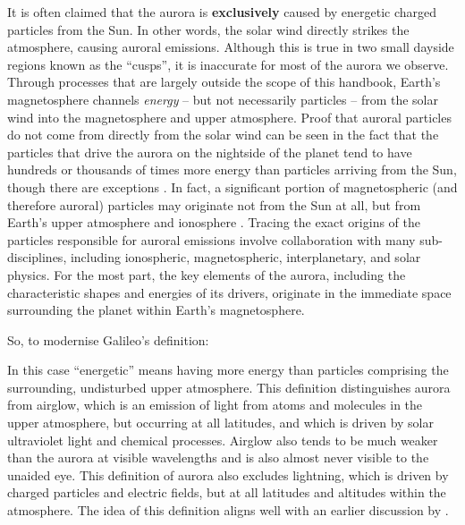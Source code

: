 \documentclass{article}
\renewcommand{\cite}[1]{\parencite{#1}}
\begin{document}
It is often claimed that the aurora is \textbf{exclusively} caused by energetic charged particles from the Sun. In other words, the solar wind directly strikes the atmosphere, causing auroral emissions. Although this is true in two small dayside regions known as the ``cusps'',  it is inaccurate for most of the aurora we observe. Through processes that are largely outside the scope of this handbook, Earth's magnetosphere channels {\it energy} -- but not necessarily particles -- from the solar wind into the magnetosphere and upper atmosphere.   
Proof that auroral particles do not come from directly from the solar wind can be seen in the fact that the particles that drive the aurora on the nightside of the planet tend to have hundreds or thousands of times more energy than particles arriving from the Sun, though there are exceptions \cite{Hosokawa2024}. In fact, a significant portion of magnetospheric (and therefore auroral) particles may originate not from the Sun at all, but from Earth's upper atmosphere and ionosphere \cite{Chappell1987}. Tracing the exact origins of the particles responsible for auroral emissions involve collaboration with many sub-disciplines, including ionospheric, magnetospheric, interplanetary, and solar physics. For the most part, the key elements of the aurora, including the characteristic shapes and energies of its drivers, originate in the immediate space surrounding the planet within Earth's magnetosphere. 

So, to modernise Galileo's definition: 
\newline

\noindent{} 
\newline

In this case ``energetic'' means having more energy than particles comprising the surrounding, undisturbed upper atmosphere. This definition distinguishes aurora from airglow, which is an emission of light from atoms and molecules in the upper atmosphere, but occurring at all latitudes, and which is driven by solar ultraviolet light and chemical processes. Airglow also tends to be much weaker than the aurora at visible wavelengths and is also almost never visible to the unaided eye. This definition of aurora also excludes lightning, which is driven by charged particles and electric fields, but at all latitudes and altitudes within the atmosphere. The idea of this definition aligns well with an earlier discussion by \textcite{clarke2004}.
\end{document}
